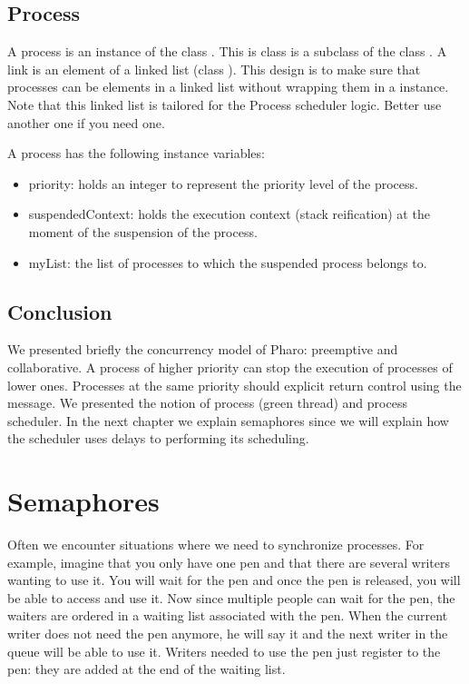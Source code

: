 \documentclass[10pt,twoside,english]{_support/latex/sbabook/sbabook}
\begin{document}
\section{Process}
A process is an instance of the class . 
This is class is a subclass of the class . 
A link is an element of a linked list (class ). 
This design is to make sure that processes can be elements in a linked list without wrapping them in a  instance. 
Note that this linked list is tailored for the Process scheduler logic. 
Better use another one if you need one.

A process has the following instance variables:

\begin{itemize}
\item priority: holds an integer to represent the priority level of the process.
\item suspendedContext: holds the execution context (stack reification) at the moment of the suspension of the process.
\item myList: the list of processes to which the suspended process belongs to. 
\end{itemize}
\section{Conclusion}
We presented briefly the concurrency model of Pharo: preemptive and collaborative. A process of higher priority can stop the execution of processes of lower ones. 
Processes at the same priority should explicit return control using the  message.
We presented the notion of process (green thread) and process scheduler. 
In the next chapter we explain semaphores since we will explain how the scheduler uses delays to performing its scheduling. 
\chapter{Semaphores}
Often we encounter situations where we need to synchronize processes.
For example, imagine that you only have one pen and that there are several writers wanting to use it.
You will wait for the pen and once the pen is released, you will be able to access and use it.
Now since multiple people can wait for the pen, the waiters are ordered in a waiting list associated with the pen.
When the current writer does not need the pen anymore, he will say it and the next writer in the queue will be able to use it.
Writers needed to use the pen just register to the pen: they are added at the end of the waiting list.
\end{document}
